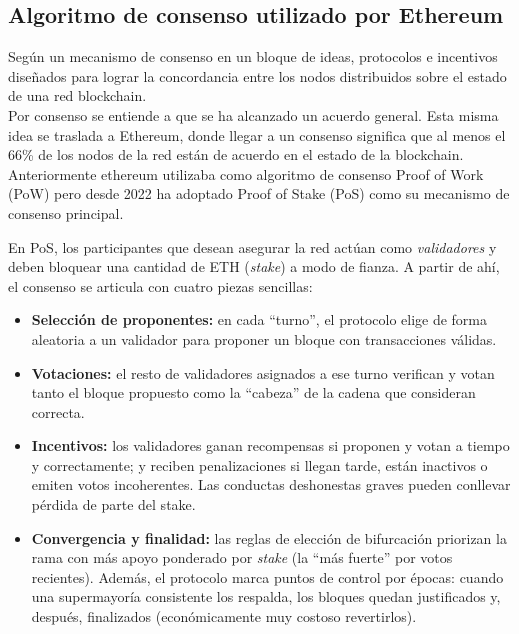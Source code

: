 \subsection{Algoritmo de consenso utilizado por Ethereum}

Según \cite{documentacionEthereum} un mecanismo de consenso en un bloque de ideas, protocolos e incentivos
diseñados para lograr la concordancia entre los nodos distribuidos sobre el estado de una red blockchain.\\

Por consenso se entiende a que se ha alcanzado un acuerdo general. Esta misma idea se traslada a Ethereum,
donde llegar a un consenso significa que al menos el 66\% de los nodos de la red están de acuerdo en el estado
de la blockchain.\\ 

Anteriormente ethereum utilizaba como algoritmo de consenso Proof of Work (PoW) pero desde 2022 ha adoptado
Proof of Stake (PoS) como su mecanismo de consenso principal.

En PoS, los participantes que desean asegurar la red actúan como \textit{validadores} y deben bloquear una cantidad de ETH (\textit{stake}) a modo de fianza. A partir de ahí, el consenso se articula con cuatro piezas sencillas:

\begin{itemize}
\item \textbf{Selección de proponentes:} en cada “turno”, el protocolo elige de forma aleatoria a un validador para proponer un bloque con transacciones válidas.
\item \textbf{Votaciones:} el resto de validadores asignados a ese turno verifican y votan tanto el bloque propuesto como la “cabeza” de la cadena que consideran correcta.
\item \textbf{Incentivos:} los validadores ganan recompensas si proponen y votan a tiempo y correctamente; y reciben penalizaciones si llegan tarde, están inactivos o emiten votos incoherentes. Las conductas deshonestas graves pueden conllevar pérdida de parte del stake.
\item \textbf{Convergencia y finalidad:} las reglas de elección de bifurcación priorizan la rama con más apoyo ponderado por \textit{stake} (la “más fuerte” por votos recientes). Además, el protocolo marca puntos de control por épocas: cuando una supermayoría consistente los respalda, los bloques quedan justificados y, después, finalizados (económicamente muy costoso revertirlos).
\end{itemize}

